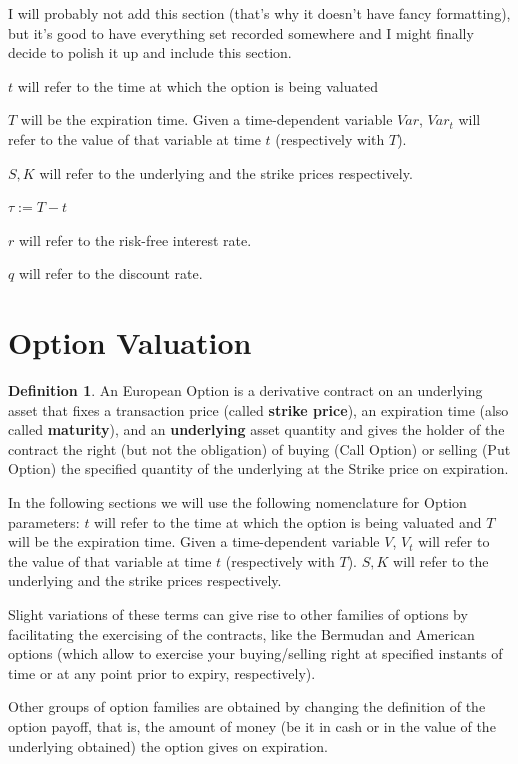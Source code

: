 \documentclass[12,twoside]{mammeTFM}
\theoremstyle{definition}
\newtheorem{definition}[thm]{Definition}
\theoremstyle{remark}
\begin{document}
I will probably not add this section (that's why it doesn't have fancy formatting), but it's good to have everything set recorded somewhere and I might finally decide to polish it up and include this section.

$t$ will refer to the time at which the option is being valuated

$T$ will be the expiration time. Given a time-dependent variable $Var$, $Var_t$ will refer to the value of that variable at time $t$ (respectively with $T$). 

$S, K$ will refer to the underlying and the strike prices respectively.

$\tau := T - t$

$r$ will refer to the risk-free interest rate.

$q$ will refer to the discount rate.

\section{Option Valuation}

\begin{definition}
An European Option is a derivative contract on an underlying asset that fixes a transaction price (called \textbf{strike price}), an expiration time (also called \textbf{maturity}), and an \textbf{underlying} asset quantity and gives the holder of the contract the right (but not the obligation) of buying (Call Option) or selling (Put Option) the specified quantity of the underlying at the Strike price on expiration.
\end{definition}

In the following sections we will use the following nomenclature for Option parameters: $t$ will refer to the time at which the option is being valuated and $T$ will be the expiration time. Given a time-dependent variable $V$, $V_t$ will refer to the value of that variable at time $t$ (respectively with $T$). $S, K$ will refer to the underlying and the strike prices respectively.

Slight variations of these terms can give rise to other families of options by facilitating the exercising of the contracts, like the Bermudan and American options (which allow to exercise your buying/selling right at specified instants of time or at any point prior to expiry, respectively).

Other groups of option families are obtained by changing the definition of the option payoff, that is, the amount of money (be it in cash or in the value of the underlying obtained) the option gives on expiration.
\end{document}

